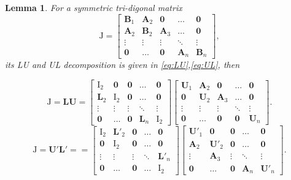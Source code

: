 \documentclass[conference]{IEEEtran}
\newtheorem{lemma}{Lemma}
\begin{document}
\begin{lemma}\label{lemma:1}
For a symmetric tri-digonal matrix
\[
\bm{\mathrm{J}}=\begin{bmatrix}
                 \bm{B}_1 & \bm{A}_2 & \bm{0} & \dots & \bm{0} \\
                 \bm{A}_2 & \bm{B}_2 & \bm{A}_3 & \dots & \bm{0} \\
                 \vdots & \vdots & \vdots & \ddots & \vdots \\
                 \bm{0} & \dots & \bm{0} & \bm{A}_{n} & \bm{B}_{n}
               \end{bmatrix},
\] its LU and UL decomposition is given in \eqref{eq:LU},\eqref{eq:UL}, then 
\begin{figure}[!t]
\begin{equation}\label{eq:LU}
\bm{\mathrm{J}}=\bm{L}\bm{U}=
\begin{bmatrix}
                 \bm{\mathrm{I}}_2 & \bm{0} & \bm{0} & \dots & \bm{0} \\
                 \bm{L}_2 & \bm{\mathrm{I}}_2 & \bm{0} & \dots & \bm{0} \\
                 \vdots & \vdots & \vdots & \ddots & \vdots \\
                 \bm{0} & \dots & \bm{0} & \bm{L}_{n} & \bm{\mathrm{I}}_{2}
               \end{bmatrix}\begin{bmatrix}
                 \bm{U}_1 & \bm{A}_2 & \bm{0} & \dots & \bm{0} \\
                 \bm{0} & \bm{U}_2 & \bm{A}_3 & \dots & \bm{0} \\
                 \vdots & \vdots & \vdots & \ddots & \vdots \\
                 \bm{0} & \dots & \bm{0} & \bm{0} & \bm{U}_{n}
               \end{bmatrix}.
\end{equation}
\begin{equation}\label{eq:UL}
\bm{\mathrm{J}}=\bm{U}'\bm{L}'==\begin{bmatrix}
                 \bm{\mathrm{I}}_2 & \bm{L'}_2 & \bm{0} & \dots & \bm{0} \\
                 \bm{0} & \bm{\mathrm{I}}_2 & \bm{0} & \dots & \bm{0} \\
                 \vdots & \vdots & \vdots & \ddots & \bm{L'}_{n} \\
                 \bm{0} & \dots & \bm{0} & \dots & \bm{\mathrm{I}}_{2}
               \end{bmatrix}
               \begin{bmatrix}
                 \bm{U'}_1 & \bm{0} & \bm{0} & \dots & \bm{0} \\
                 \bm{A}_2 & \bm{U'}_2 & \bm{0} & \dots & \bm{0} \\
                 \vdots & \bm{A}_3 & \vdots & \ddots & \vdots \\
                 \bm{0} & \dots & \bm{0} & \bm{A}_n & \bm{U'}_{n}
               \end{bmatrix}.
\end{equation}
\hrulefill
\end{figure}


\end{lemma}
\end{document}
